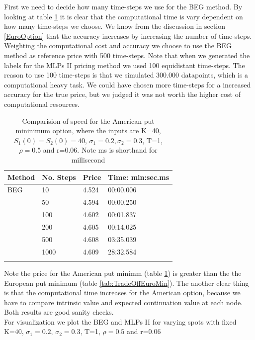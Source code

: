 First we need to decide how many time-steps we use for the BEG method. By looking at table \ref{tab:TradeOffAmerMin} it is clear that the computational time is vary dependent on how many time-steps we choose. We know from the discussion in section \ref{EuroOption} that the accuracy increases by increasing the number of time-steps. Weighting the computational cost and accuracy we choose to use the BEG method as reference price with 500 time-steps. Note that when we generated the labels for the MLPs II pricing method we used 100 equidistant time-steps. The reason to use 100 time-steps is that we simulated 300.000 datapoints, which is a computational heavy task. We could have chosen more time-steps for a increased accuracy for the true price, but we judged it was not worth the higher cost of computational resources.\\

\begin{table}[th]
\caption{Comparision of speed for the American put mininimum option, where the inputs are K=40, $S_1(0)=S_2(0)=40$, $\sigma_1=0.2, \sigma_2=0.3$, T=1, $\rho=0.5$  and r=0.06. Note ms is shorthand for millisecond}
\label{tab:TradeOffAmerMin}
\centering
\begin{tabular}{l l l l}
\toprule
\textbf{Method} & \textbf{No. Steps} & \textbf{Price} & \textbf{Time: min:sec.ms} \\
\midrule
BEG & 10 & 4.524 & 00:00.006\\
& 50 & 4.594 & 00:00.250\\
& 100 & 4.602 & 00:01.837\\
& 200 & 4.605 & 00:14.025\\
& 500 & 4.608 & 03:35.039\\
& 1000 & 4.609 & 28:32.584\\
\bottomrule\\
\end{tabular}
\end{table}

Note the price for the American put minimm (table \ref{tab:TradeOffAmerMin}) is greater than the the European put minimum (table \ref{tab:TradeOffEuroMin}). The another clear thing is that the computational time increases for the American option, because we have to compare intrinsic value and expected continuation value at each node. Both results are good sanity checks.\\

For visualization we plot the BEG and MLPs II for varying spots with fixed K=40, $\sigma_1=0.2$, $\sigma_2=0.3$, T=1, $\rho=0.5$  and r=0.06

